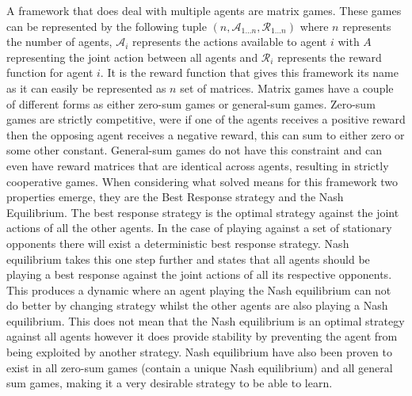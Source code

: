 \documentclass[conference]{IEEEtran}
\begin{document}
A framework that does deal with multiple agents are matrix games. These games
can be represented by the following tuple $(n, \mathcal{A}_{1...n}, \mathcal{R}_{1...n})$
where $n$ represents the number of agents, $\mathcal{A}_{i}$ represents the actions
available to agent $i$ with $A$ representing the joint action between all agents and 
$\mathcal{R}_{i}$ represents the reward function for agent $i$. It is the reward 
function that gives this framework its name as it can easily be represented as 
$n$ set of matrices. Matrix games have a couple of different forms as either zero-sum games or general-sum
games. Zero-sum games are strictly competitive, were if one of the agents receives a
positive reward then the opposing agent receives a negative reward, this can sum to 
either zero or some other constant. General-sum games do not have this constraint and
can even have reward matrices that are identical across agents, resulting in strictly
cooperative games. When considering what solved means for this framework two properties emerge, they are
the Best Response strategy and the Nash Equilibrium. The best response strategy is the optimal strategy against the joint actions of all the
other agents. In the case of playing against a set of stationary opponents there will 
exist a deterministic best response strategy. Nash equilibrium takes this one step further and states that all agents should be playing
a best response against the joint actions of all its respective opponents. This produces
a dynamic where an agent playing the Nash equilibrium can not do better by changing strategy
whilst the other agents are also playing a Nash equilibrium. This does not mean that the
Nash equilibrium is an optimal strategy against all agents however it does provide 
stability by preventing the agent from being exploited by another strategy. Nash equilibrium
have also been proven to exist in all zero-sum games (contain a unique Nash equilibrium) and
all general sum games, making it a very desirable strategy to be able to learn.
\end{document}
